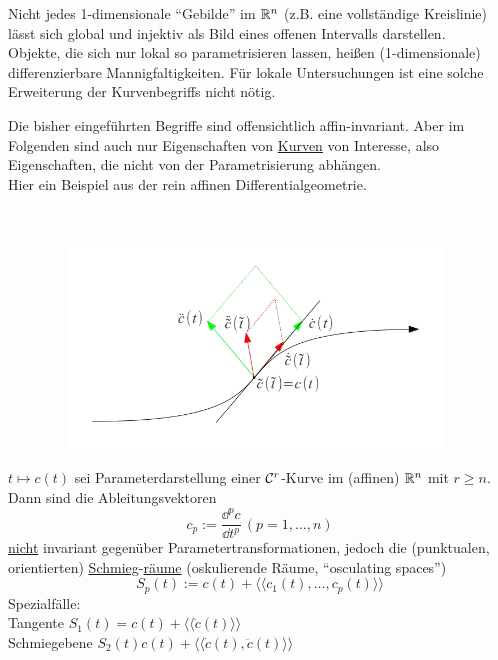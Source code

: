 \begin{bemerkung}
 Nicht jedes 1-dimensionale "`Gebilde"' im \(\mathbb{R}^n\) (z.B. eine vollständige Kreislinie) lässt sich global und injektiv als Bild eines offenen Intervalls darstellen. \\
 Objekte, die sich nur lokal so parametrisieren lassen, heißen (1-dimensionale) differenzierbare Mannigfaltigkeiten. Für lokale Untersuchungen ist eine solche Erweiterung der Kurvenbegriffs nicht nötig.
\end{bemerkung}

Die bisher eingeführten Begriffe sind offensichtlich affin-invariant. Aber im Folgenden sind auch nur Eigenschaften von \uline{Kurven} von Interesse, also Eigenschaften, die nicht von der Parametrisierung abhängen. \\
Hier ein Beispiel aus der rein affinen Differentialgeometrie. 
\begin{bsp}\(\)
\begin{figure}[ht]
 \centering
 \includegraphics[width=11cm, height=5.5cm]{Bilder/Bsp1.jpg}
\end{figure} 
\end{bsp}

\begin{satz}
 \(t \mapsto c(t)\) sei Parameterdarstellung einer \(\mathcal{C}^r\)-Kurve im (affinen) \(\mathbb{R}^n\) mit \(r \ge n\). Dann sind die Ableitungsvektoren 
 \[
  c_p:= \frac{\dd^p c}{\dd t^p} \, (p=1,\dots, n)
 \]
\uline{nicht} invariant gegenüber Parametertransformationen, jedoch die (punktualen, orientierten) \uline{Schmieg}-\uline{räume} (oskulierende Räume, "`osculating spaces"') 
\[
 S_p(t):= c(t) + \langle \langle c_1(t), \dots , c_p(t) \rangle \rangle
\]
Spezialfälle: \\
Tangente \(S_1(t)=c(t) + \langle \langle \dot c(t) \rangle \rangle \) \\
Schmiegebene \( S_2(t) c(t) + \langle \langle \dot c(t), \ddot c(t) \rangle \rangle \)
\end{satz}

